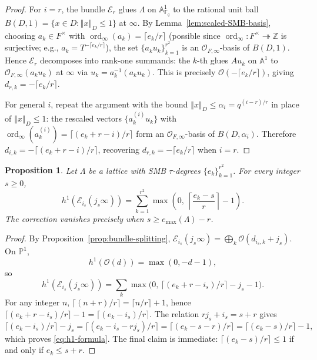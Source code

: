 \documentclass[12pt]{amsart}
\newtheorem{prop}[thm]{Proposition}
\theoremstyle{definition}
\theoremstyle{remark}
\numberwithin{equation}{section}
\numberwithin{thm}{section}
\DeclareMathOperator{\ord}{ord}
\newcommand{\cE}{\mathcal{E}}
\newcommand{\cO}{\mathcal{O}}
\newcommand{\A}{\mathbb{A}}
\newcommand{\F}{\mathbb{F}}
\newcommand{\PP}{\mathbb{P}}
\newcommand{\Z}{\mathbb{Z}}
\newcommand{\La}{\Lambda}
\newcommand{\norm}[1]{\left\Vert#1\right\Vert}
\begin{document}
	\begin{proof}
		For $i = r$, the bundle $\cE_r$ glues $\La$ on $\A^1_{\F_q}$ to the rational unit ball $B(D, 1) = \{x \in D : \norm{x}_D \leq 1\}$ at $\infty$. By Lemma~\ref{lem:scaled-SMB-basis}, choosing $a_k \in F^\times$ with $\ord_\infty(a_k) = \lceil e_k/r\rceil$ (possible since $\ord_\infty\colon F^\times \twoheadrightarrow \Z$ is surjective; e.g., $a_k = T^{-\lceil e_k/r\rceil}$), the set $\{a_k u_k\}_{k=1}^{r^2}$ is an $\cO_{F,\infty}$-basis of $B(D, 1)$. Hence $\cE_r$ decomposes into rank-one summands: the $k$-th glues $A u_k$ on $\A^1$ to $\cO_{F,\infty}(a_k u_k)$ at $\infty$ via $u_k = a_k^{-1}(a_k u_k)$. This is precisely $\cO(-\lceil e_k/r\rceil)$, giving $d_{r,k} = -\lceil e_k/r\rceil$.
		
		For general $i$, repeat the argument with the bound $\norm{x}_D \leq \alpha_i = q^{(i-r)/r}$ in place of $\norm{x}_D \leq 1$: the rescaled vectors $\{a_k^{(i)} u_k\}$ with $\ord_\infty(a_k^{(i)}) = \lceil (e_k + r - i)/r\rceil$ form an $\cO_{F,\infty}$-basis of $B(D, \alpha_i)$. Therefore $d_{i,k} = -\lceil (e_k + r - i)/r\rceil$, recovering $d_{r,k} = -\lceil e_k/r\rceil$ when $i = r$.
	\end{proof}
	
	\begin{prop}\label{prop:h1-explicit}
		Let $\La$ be a lattice with SMB $\tau$-degrees $\{e_k\}_{k=1}^{r^2}$. For every integer $s \geq 0$,
		\begin{equation}\label{eq:h1-formula}
			h^1(\cE_{i_s}(j_s\infty)) = \sum_{k=1}^{r^2} \max\!\left(0,\ \left\lceil \frac{e_k - s}{r}\right\rceil - 1\right).
		\end{equation}
		The correction vanishes precisely when $s \geq e_{\max}(\La) - r$.
	\end{prop}
	
	\begin{proof}
		By Proposition~\ref{prop:bundle-splitting}, $\cE_{i_s}(j_s\infty) = \bigoplus_k \cO(d_{i_s,k} + j_s)$. On $\PP^1$,
		\[
		h^1(\cO(d)) = \max(0, -d-1),
		\]
		so
		\[
		h^1(\cE_{i_s}(j_s\infty)) = \sum_k \max\bigl(0,\, \lceil (e_k + r - i_s)/r\rceil - j_s - 1\bigr).
		\]
		For any integer $n$, $\lceil (n+r)/r\rceil = \lceil n/r\rceil + 1$, hence $\lceil (e_k + r - i_s)/r\rceil - 1 = \lceil (e_k - i_s)/r\rceil$. The relation $rj_s + i_s = s + r$ gives
		\[
		\lceil (e_k - i_s)/r\rceil - j_s = \lceil (e_k - i_s - rj_s)/r\rceil = \lceil (e_k - s - r)/r\rceil = \lceil (e_k - s)/r\rceil - 1,
		\]
		which proves \eqref{eq:h1-formula}. The final claim is immediate: $\lceil (e_k - s)/r\rceil \leq 1$ if and only if $e_k \leq s + r$.
	\end{proof}
	
\end{document}
